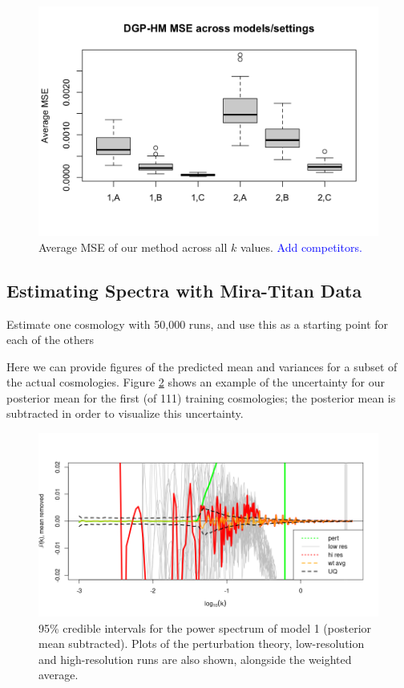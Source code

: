 \documentclass[11pt]{article}
\begin{document}
\begin{figure}[ht]
    \centering
    \includegraphics[width=6in]{collect_sims.png}
    \caption{Average MSE of our method across all $k$ values. \textcolor{blue}{Add competitors.}}
    \label{fig:collect_sims}
\end{figure}

\subsection{Estimating Spectra with Mira-Titan Data}
\label{subsec:mira_fit}

Estimate one cosmology with 50,000 runs, and use this as a starting point for each of the others

Here we can provide figures of the predicted mean and variances for a subset of the actual cosmologies. Figure \ref{fig:plot_fit} shows an example of the uncertainty for our posterior mean for the first (of 111) training cosmologies; the posterior mean is subtracted in order to visualize this uncertainty.

\begin{figure}[ht]
    \centering
    \includegraphics[width=6in]{plot_fit.png}
    \caption{95\% credible intervals for the power spectrum of model 1 (posterior mean subtracted). Plots of the perturbation theory, low-resolution and high-resolution runs are also shown, alongside the weighted average.}
    \label{fig:plot_fit}
\end{figure}
\end{document}

